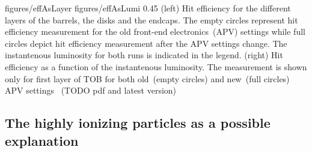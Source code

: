                  {figures/effAsLayer}
                 {figures/effAsLumi} %
                 {0.45}       %
                 {(left) Hit efficiency for the different layers of the barrels, the disks and the endcaps. The empty circles represent hit efficiency measurement for the old front-end electronics~(APV) settings while full circles depict hit efficiency measurement after the APV settings change. The instantenous luminosity for both runs is indicated in the legend. (right) Hit efficiency as a function of the instantenous luminosity. The measurement is shown only for first layer of TOB for both old~(empty circles) and new~(full circles) APV settings~\cite{website:hitEff} (TODO pdf and latest version) } %







\subsection{The highly ionizing particles as a possible explanation}

